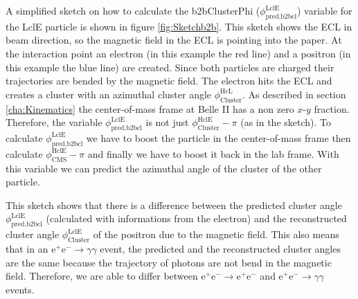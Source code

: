 \documentclass[a4paper,11pt,twosided,final,german,openbib,pdftex,listof=totoc,bibliography=totoc]{scrbook}
\begin{document}
A simplified sketch on how to calculate the b2bClusterPhi ($\phi_{\textrm{pred,b2bcl}}^{\textrm{LclE}}$) variable for the LclE particle is shown in figure \ref{fig:Sketchb2b}. This sketch shows the ECL in beam direction, so the magnetic field in the ECL is pointing into the paper. At the interaction point an electron (in this example the red line) and a positron (in this example the blue line) are created. Since both particles are charged their trajectories are bended by the magnetic field. The electron hits the ECL and creates a cluster with an azimuthal cluster angle $\phi_{\textrm{Cluster}}^{\textrm{HcL}}$. As described in section \ref{cha:Kinematics} the center-of-mass frame at Belle II has a non zero $x$-$y$ fraction. 
Therefore, the variable $\phi_{\textrm{pred,b2bcl}}^{\textrm{LclE}}$ is not just $ \phi_{\textrm{Cluster}}^{\textrm{HclE}} - \pi$ (as in the sketch). To calculate $\phi_{\textrm{pred,b2bcl}}^{\textrm{LclE}}$ we have to boost the particle in the center-of-mass frame then calculate $ \phi_{\textrm{CMS}}^{\textrm{HclE}}- \pi$ and finally we have to boost it back in the lab frame. With this variable we can predict the azimuthal angle of the cluster of the other particle. 

This sketch shows that there is a difference between the predicted cluster angle $\phi_{\textrm{pred,b2bcl}}^{\textrm{LclE}}$ (calculated with informations from the electron) and the reconstructed cluster angle $ \phi_{\textrm{Cluster}}^{\textrm{LclE}}$ of the positron due to the magnetic field. This also means that in an $\textrm{e}^+ \textrm{e}^- \rightarrow \gamma \gamma$ event, the predicted and the reconstructed cluster angles are the same because the trajectory of photons are not bend in the magnetic field. Therefore, we are able to differ between $\textrm{e}^+ \textrm{e}^- \rightarrow \textrm{e}^+ \textrm{e}^-$ and $\textrm{e}^+ \textrm{e}^- \rightarrow \gamma \gamma$ events.
\end{document}
